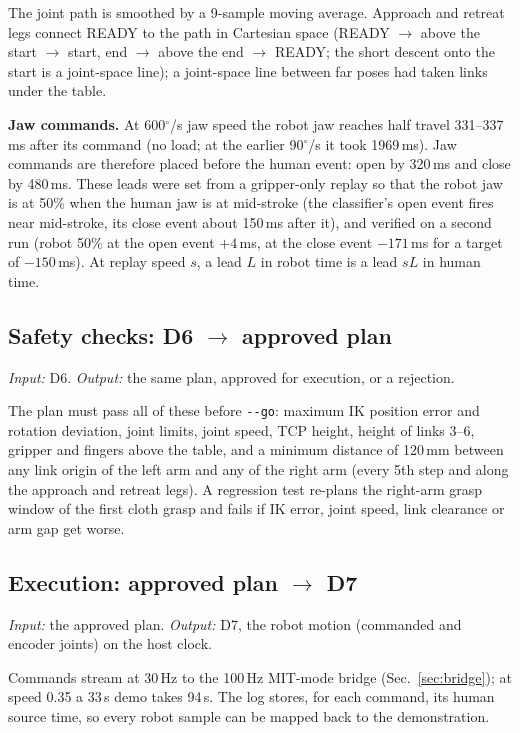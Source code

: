 \documentclass[conference,10pt]{IEEEtran}
\newcommand{\mm}{\,mm\xspace}
\begin{document}
The joint path is smoothed by a 9-sample moving average. Approach and retreat legs connect READY to the path in Cartesian
space (READY $\to$ above the start $\to$ start, end $\to$ above the end $\to$ READY; the short descent onto the start is a
joint-space line); a joint-space line between far poses had taken links under the table.

\textbf{Jaw commands.} At 600$^\circ$/s jaw speed the robot jaw reaches half travel 331--337\,ms after its command (no load;
at the earlier 90$^\circ$/s it took 1969\,ms). Jaw commands are therefore placed before the human event: open by 320\,ms
and close by 480\,ms. These leads were set from a gripper-only replay so that the robot jaw is at 50\% when the human jaw
is at mid-stroke (the classifier's open event fires near mid-stroke, its close event about 150\,ms after it), and verified
on a second run (robot 50\% at the open event $+4$\,ms, at the close event $-171$\,ms for a target of $-150$\,ms). At replay
speed $s$, a lead $L$ in robot time is a lead $sL$ in human time.

\subsection{Safety checks: D6 $\to$ approved plan}\label{sec:checks}
\emph{Input:} D6. \emph{Output:} the same plan, approved for execution, or a rejection.

The plan must pass all of these before \texttt{-{}-go}: maximum IK position error and rotation deviation, joint limits,
joint speed, TCP height, height of links 3--6, gripper and fingers above the table, and a minimum distance of 120\mm
between any link origin of the left arm and any of the right arm (every 5th step and along the approach and retreat legs).
A regression test re-plans the right-arm grasp window of the first cloth grasp and fails if IK error, joint speed, link
clearance or arm gap get worse.

\subsection{Execution: approved plan $\to$ D7}\label{sec:replay}
\emph{Input:} the approved plan. \emph{Output:} D7, the robot motion (commanded and encoder joints) on the host clock.

Commands stream at 30\,Hz to the 100\,Hz MIT-mode bridge (Sec.~\ref{sec:bridge}); at speed 0.35 a 33\,s demo takes 94\,s.
The log stores, for each command, its human source time, so every robot sample can be mapped back to the demonstration.
\end{document}
